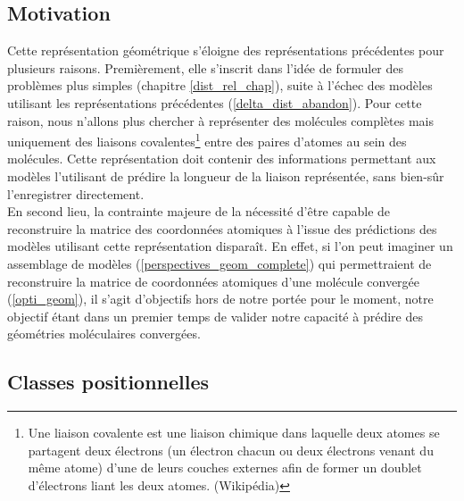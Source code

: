 \label{repr_locale_liaisons_cov}

\subsection{Motivation}

\par Cette représentation géométrique s'éloigne des représentations précédentes pour plusieurs raisons. Premièrement, elle s'inscrit dans l'idée de formuler des problèmes plus simples (chapitre \ref{dist_rel_chap}), suite à l'échec des modèles utilisant les représentations précédentes (\ref{delta_dist_abandon}). Pour cette raison, nous n'allons plus chercher à représenter des molécules complètes mais uniquement des liaisons covalentes\footnote{Une liaison covalente est une liaison chimique dans laquelle deux atomes se partagent deux électrons (un électron chacun ou deux électrons venant du même atome) d'une de leurs couches externes afin de former un doublet d'électrons liant les deux atomes. (Wikipédia)} entre des paires d'atomes au sein des molécules. Cette représentation doit contenir des informations permettant aux modèles l'utilisant de prédire la longueur de la liaison représentée, sans bien-sûr l'enregistrer directement.\\
En second lieu, la contrainte majeure de la nécessité d'être capable de reconstruire la matrice des coordonnées atomiques à l'issue des prédictions des modèles utilisant cette représentation disparaît. En effet, si l'on peut imaginer un assemblage de modèles (\ref{perspectives_geom_complete}) qui permettraient de reconstruire la matrice de coordonnées atomiques d'une molécule convergée (\ref{opti_geom}), il s'agit d'objectifs hors de notre portée pour le moment, notre objectif étant dans un premier temps de valider notre capacité à prédire des géométries moléculaires convergées.

\subsection{Classes positionnelles}

\label{repr_locale_liaisons_cov_classes_pos}

